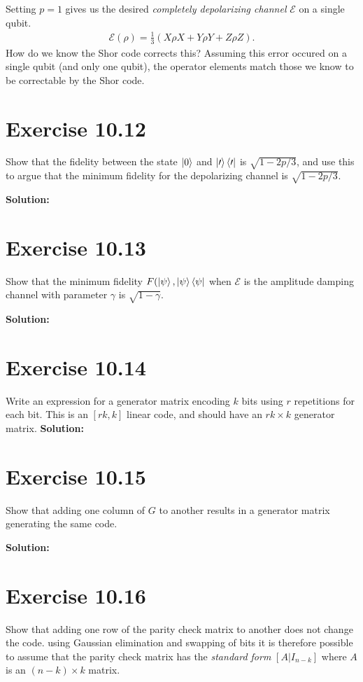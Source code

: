 \documentclass{book}
\newcommand{\mc}[1]{\mathcal{#1}}
\begin{document}
    Setting $p = 1$ gives us the desired \emph{completely depolarizing channel} $\mc{E}$ on a single qubit.
    \begin{align}
        \mc{E}(\rho) = \frac{1}{3} (X \rho X + Y \rho Y + Z\rho Z).
    \end{align}
    How do we know the Shor code corrects this? Assuming this error occured on a single qubit (and only one qubit), the operator elements match those we know to be correctable by the Shor code. 

\section*{Exercise 10.12}
    Show that the fidelity between the state $\ket{0}$ and $\mc{\ket{0}\bra{0}}$ is $\sqrt{1-2p/3}$, and use this to argue that the minimum fidelity for the depolarizing channel is $\sqrt{1-2p/3}$.

    \textbf{Solution:}

\section*{Exercise 10.13}
    Show that the minimum fidelity $F(\ket{\psi}, \mc{\ket{\psi}\bra{\psi}}$ when $\mc{E}$ is the amplitude damping channel with parameter $\gamma$ is $\sqrt{1-\gamma}$.

    \textbf{Solution:}

\section*{Exercise 10.14}
    Write an expression for a generator matrix encoding $k$ bits using $r$ repetitions for each bit. This is an $[rk, k]$ linear code, and should have an $rk\times k$ generator matrix.
    \textbf{Solution:}

\section*{Exercise 10.15}
    Show that adding one column of $G$ to another results in a generator matrix generating the same code.

    \textbf{Solution:}

\section*{Exercise 10.16}
    Show that adding one row of the parity check matrix to another does not change the code. using Gaussian elimination and swapping of bits it is therefore possible to assume that the parity check matrix has the \emph{standard form} $[A\vert I_{n-k}]$ where $A$ is an $(n-k)\times k$ matrix.
\end{document}
